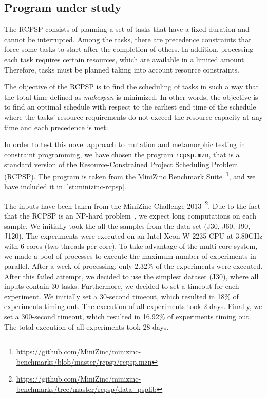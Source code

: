\subsection{Program under study}
The RCPSP consists of planning a set of tasks that have a fixed duration and cannot be interrupted. Among the tasks, there are precedence constraints that force some tasks to start after the completion of others. In addition, processing each task requires certain resources, which are available in a limited amount. Therefore, tasks must be planned taking into account resource constraints.

The objective of the RCPSP is to find the scheduling of tasks in such a way that the total time defined as \textit{makespan} is minimized. In other words, the objective is to find an optimal schedule with respect to the earliest end time of the schedule where the tasks' resource requirements do not exceed the resource capacity at any time and each precedence is met.

In order to test this novel approach to mutation and metamorphic
testing in constraint programming, we have chosen the program
\lstinline|rcpsp.mzn|, that is a standard version of
the Resource-Constrained Project Scheduling Problem (RCPSP). The
program is taken from the MiniZinc Benchmark
Suite~\footnote{\url{https://github.com/MiniZinc/minizinc-benchmarks/blob/master/rcpsp/rcpsp.mzn}},
and we have included it in \ref{lst:minizinc-rcpsp}.

The inputs have been taken from the MiniZinc Challenge
2013~\footnote{\url{https://github.com/MiniZinc/minizinc-benchmarks/tree/master/rcpsp/data_psplib}}. 
Due to the fact that the RCPSP is an NP-hard problem~\cite{herroelen1998resource, abdolshah2014review,hartmann2022updated}, we expect long computations on each sample. We initially took the all the samples from the
data set (J30, J60, J90, J120). 
The experiments were executed on an Intel Xeon W-2235 CPU at 3.80GHz with 6 cores (two threads per core). To take advantage of the multi-core system, we made a pool of processes to execute the maximum number of experiments in parallel. After a week of processing, only 2.32\% of the experiments were executed.
After this failed attempt, we decided to use the simplest
dataset (J30), where all inputs contain 30 tasks. Furthermore, we decided to set a timeout for each experiment. We initially set a 30-second timeout, which resulted in 18\% of experiments timing out. The execution of all experiments took 2 days. Finally, we set a 300-second timeout, which resulted in 16.92\% of experiments timing out. The total execution of all experiments took 28 days. 

